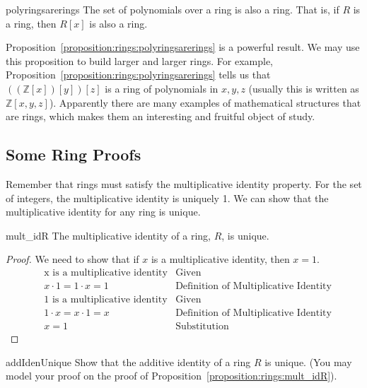 \begin{prop}{polyringsarerings} The set of polynomials over a ring is also a ring. That is, if $R$ is a ring, then $R[x]$ is also a ring.
\end{prop}

Proposition~\ref{proposition:rings:polyringsarerings} is a powerful result. We may use this proposition to build larger and larger rings. For example, Proposition~\ref{proposition:rings:polyringsarerings} tells us that $((\mathbb{Z}[x])[y])[z]$ is a ring of polynomials in $x,y,z$  (usually this is written as $\mathbb{Z}[x,y,z]$). Apparently there are many examples of mathematical structures that are rings, which makes them an interesting and fruitful object of study.



\subsection{Some Ring Proofs}

Remember that rings must satisfy the multiplicative identity property. For the set of integers, the multiplicative identity is uniquely 1. We can show that the multiplicative identity for any ring is unique.

\begin{prop}{mult_idR}
The multiplicative identity of a ring, $R$, is unique.\\

\begin{proof}
We need to show that if $x$ is a multiplicative identity, then $x=1$.
\begin{align*}
&\text{x is a multiplicative identity} & \text{Given}\\
&x\cdot1=1\cdot x=1 & \text{Definition of Multiplicative Identity}\\
&\text{1 is a multiplicative identity} & \text{Given}\\  
&1\cdot x=x\cdot1=x & \text{Definition of Multiplicative Identity} \\
&x=1 & \text{Substitution}
\end{align*}
\end{proof}
\end{prop}

\begin{exercise}{addIdenUnique}
Show that the additive identity of a ring $R$ is unique.  (You may model your proof on the proof of Proposition~\ref{proposition:rings:mult_idR}).
\end{exercise}


